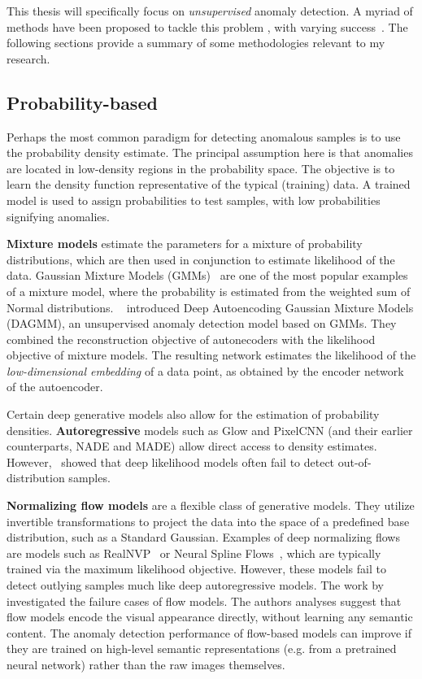 This thesis will specifically focus on \textit{unsupervised} anomaly detection. A myriad of methods have been proposed to tackle this problem \cite{pang_deep_2021,ruff_unifying_2021}, with varying success~\cite{han2022adbench}. The following sections provide a summary of some methodologies relevant to my research.

\subsection{Probability-based}


Perhaps the most common paradigm for detecting anomalous samples is to use the probability density estimate. The principal assumption here is that anomalies are located in low-density regions in the probability space. The objective is to learn the density function representative of the typical (training) data. A trained model is used to assign probabilities to test samples, with low probabilities signifying anomalies.

\textbf{Mixture models} estimate the parameters for a mixture of probability distributions, which are then used in conjunction to estimate likelihood of the data. Gaussian Mixture Models (GMMs)~\cite{reynolds2009gaussian} are one of the most popular examples of a mixture model, where the probability is estimated from the weighted sum of Normal distributions. ~\cite{zong2018deep} introduced Deep Autoencoding Gaussian Mixture Models (DAGMM), an unsupervised anomaly detection model based on GMMs. They combined the reconstruction objective of autonecoders with the likelihood objective of mixture models. The resulting network estimates the likelihood of the \textit{low-dimensional embedding} of a data point, as obtained by the encoder network of the autoencoder. 

Certain deep generative models also allow for the estimation of probability densities. \textbf{Autoregressive} models such as Glow and PixelCNN (and their earlier counterparts, NADE and MADE) allow direct access to density estimates. However,~\cite{nalisnick2018do} showed that deep likelihood models often fail to detect out-of-distribution samples.

\textbf{Normalizing flow models} are a flexible class of generative models. They utilize invertible transformations to project the data into the space of a predefined base distribution, such as a Standard Gaussian. Examples of deep normalizing flows are models such as RealNVP~\cite{dinh2017density} or Neural Spline Flows~\cite{NEURIPS2019_7ac71d43}, which are typically trained via the maximum likelihood objective. However, these models fail to detect outlying samples much like deep autoregressive models. The work by ~\cite{normflow_fails} investigated the failure cases of flow models. The authors analyses suggest that flow models encode the visual appearance directly, without learning any semantic content. The anomaly detection performance of flow-based models can improve if they are trained on high-level semantic representations (e.g. from a pretrained neural network) rather than the raw images themselves. 


